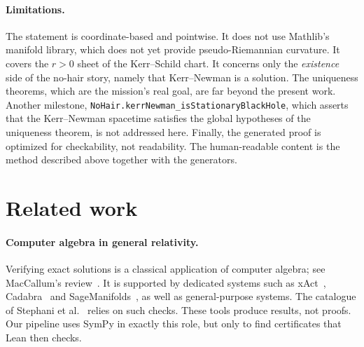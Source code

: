 \documentclass[11pt]{article}
\theoremstyle{definition}
\theoremstyle{remark}
\newcommand{\lean}[1]{\lstinline[basicstyle=\ttfamily\normalsize,columns=fullflexible,breaklines=false]{#1}}
\begin{document}
\paragraph{Limitations.}
The statement is coordinate-based and pointwise.
It does not use Mathlib's manifold library, which does not yet provide pseudo-Riemannian curvature.
It covers the $r>0$ sheet of the Kerr--Schild chart.
It concerns only the \emph{existence} side of the no-hair story, namely that Kerr--Newman is a solution.
The uniqueness theorems, which are the mission's real goal, are far beyond the present work.
Another milestone, \lean{NoHair.kerrNewman_isStationaryBlackHole}, which asserts that the Kerr--Newman spacetime satisfies the global hypotheses of the uniqueness theorem, is not addressed here.
Finally, the generated proof is optimized for checkability, not readability.
The human-readable content is the method described above together with the generators.

\section{Related work}\label{sec:related}

\paragraph{Computer algebra in general relativity.}
Verifying exact solutions is a classical application of computer algebra; see MacCallum's review~\cite{maccallum2018}.
It is supported by dedicated systems such as xAct~\cite{martingarcia2008}, Cadabra~\cite{peeters2007} and SageManifolds~\cite{gourgoulhon2015}, as well as general-purpose systems.
The catalogue of Stephani et al.~\cite{stephani2003} relies on such checks.
These tools produce results, not proofs.
Our pipeline uses SymPy in exactly this role, but only to find certificates that Lean then checks.
\end{document}
